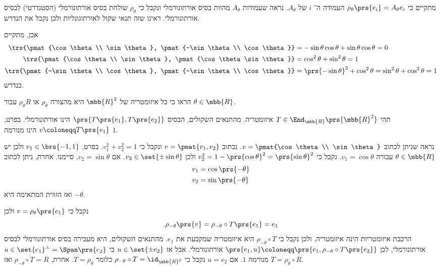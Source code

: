 \documentclass[a4paper,10pt,twoside,openany]{book}
\begin{document}
\begin{solution}
מתקיים כי
$\rho_{\theta}\prs{e_i} = A_{\theta} e_i$
העמודה ה־%
$i$
של
$A_{\theta}$.
נראה שעמודות
$A_\theta$
מהוות בסיס אורתונורמלי ונקבל כי
$\rho_{\theta}$
שולחת בסיס אורתונורמלי (הסטנדרטי) לבסיס אורתונורמלי. ראינו שזה תנאי שקול לאורתוגונליות ולכן נקבל את הנדרש.

אכן, מתקיים
\begin{align*}
    \trs{\pmat{\cos \theta \\ \sin \theta}, \pmat{-\sin \theta \\ \cos \theta}} &= -\sin \theta \cos \theta + \sin \theta \cos \theta = 0 \\
    \trs{\pmat{\cos \theta \\ \sin \theta}, \pmat{\cos \theta \sin \theta}} &= \cos^2 \theta + \sin^2 \theta = 1 \\
    \trs{\pmat{-\sin \theta \\ \cos \theta}, \pmat{-\sin \theta \\ \cos \theta}} &= \prs{-\sin \theta}^2 + \cos^2 \theta = \sin^2 \theta + \cos^2 \theta = 1
\end{align*}
כנדרש.
\end{solution}

\begin{exercisechap}
הראו כי כל איזומטריה של
$\mbb{R}^2$
היא מהצורה
$\rho_\theta$
או
$\rho_\theta R$
עבור
$\theta \in \mbb{R}$.
\end{exercisechap}

\begin{solution}
תהי
$T \in \End_{\mbb{R}}\prs{\mbb{R}^2}$
איזומטריה.
מהתנאים השקולים, הבסיס
$\prs{T\prs{e_1}, T\prs{e_2}}$
הינו אורתונורמלי.
בפרט,
$v \coloneqq T\prs{e_1}$
הינו מנורמה
$1$.

נראה שניתן לכתוב
$v = \pmat{\cos\theta \\ \sin\theta}$.
נכתוב
$v = \pmat{v_1, v_2}$
ונקבל כי
$v_1^2 + v_2^2 = 1$.
בפרט,
$v_1 \in \brs{-1,1}$
ולכן יש
$\theta \in \mbb{R}$
עבורה
$v_1 = \cos\theta$.
נקבל כי
$v_2^2 = 1 - \prs{\cos \theta}^2 = \prs{\sin \theta}^2$
ולכן
$v_2 \in \set{\pm \sin \theta}$.
אם
$v_2 = \sin\theta$,
סיימנו.
אחרת, ניתן לכתוב
\begin{align*}
    v_1 &= \cos\prs{-\theta} \\
    v_2 &= \sin\prs{-\theta}
\end{align*}
ואז הזווית המתאימה היא
$-\theta$.

נקבל כי
$v = \rho_\theta\prs{e_1}$
ולכן
\[\text{.} \rho_{-\theta}\prs{v} = \rho_{-\theta} \circ T \prs{e_1} = e_1\]
הרכבת איזומטריות הינה איזומטריה, ולכן נקבל כי
$\rho_{-\theta} \circ T$
היא איזומטריה שמקבעת את
$e_1$.
מהתנאים השקולים, היא מעבירה בסיס אורתונורמלי לבסיס אורתונורמלי, לכן
$\prs{e_1, u} \coloneqq \prs{e_1, \rho_{-\theta} \circ T\prs{e_2}}$
אורתונורמלי.
אבל אז
$u \in \set{\pm e_2}$
כי
$u \in \set{e_1}^\perp = \Span\prs{e_2}$
מנורמה
$1$.
אם
$u = e_2$
נקבל כי
$\rho_{-\theta} \circ T = \id_{\mbb{R}^2}$
כלומר
$T = \rho_{\theta}$.
אחרת,
$\rho_{-\theta} \circ T = R$
ואז
$T = \rho_{\theta} \circ R$.
\end{solution}


\printbibliography
\end{document}
